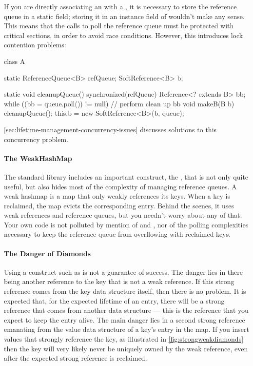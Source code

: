 If you are directly associating an  with a , it is 
necessary to store the reference queue in a static field; storing it in an
instance field of  wouldn't make any sense. This means that the calls
to poll the reference queue must be protected with critical sections, in order
to avoid race conditions. However, this introduces lock contention problems:
\begin{shortlisting}
class A {
   static ReferenceQueue<B> refQueue;
   SoftReference<B> b;
   
   static void cleanupQueue() {
      synchronized(refQueue) {
         Reference<? extends B> bb;
         while ((bb = queue.poll()) != null) {
            // perform clean up bb
         }
      }
   }
   void makeB(B b) {
      cleanupQueue();   
      this.b = new SoftReference<B>(b, queue);
   }
}
\end{shortlisting}
\autoref{sec:lifetime-management-concurrency-issues} discusses solutions to this
concurrency problem.

\paragraph{The WeakHashMap}
\label{sec:weakhashmap}

The standard library includes an important construct, the ,
that is not only quite useful, but also hides most of the complexity of managing
reference queues. A weak hashmap is a map that only weakly references its keys.
When a key is reclaimed, the map evicts the corresponding entry. Behind the
scenes, it uses weak references and reference queues, but you needn't worry about
any of that. Your own code is not polluted by mention of 
and , nor of the polling complexities necessary to keep the
reference queue from overflowing with reclaimed keys.

\paragraph{The Danger of Diamonds}
\label{sec:strongweakdiamonds}

Using a construct such as  is not a guarantee of success. The
danger lies in there being another reference to the key that is not a weak
reference. If this strong reference comes from the key data structure itself,
then there is no problem. It is expected that, for the expected lifetime of an
entry, there will be a strong reference that comes from another data structure
--- this is the reference that you expect to keep the entry alive. The main
danger lies in a second strong reference emanating from the value data structure
of a key's entry in the map. If you insert values that strongly reference the
key, as illustrated in \autoref{fig:strongweakdiamonds} then the key will very
likely never be uniquely owned by the weak reference, even after the expected
strong reference is reclaimed.

